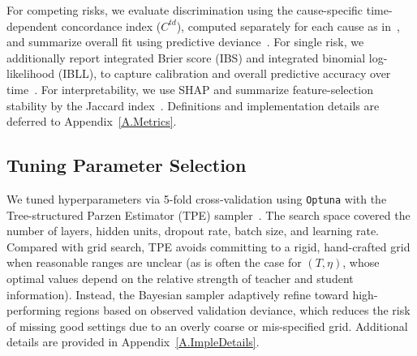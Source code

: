 \documentclass{article}
\theoremstyle{plain}
\theoremstyle{definition}
\theoremstyle{remark}
\begin{document}
For competing risks, we evaluate discrimination using the cause-specific time-dependent concordance index ($C^{td}$), computed separately for each cause as in~\citep{antolini2005time, lee2018deephit}, and summarize overall fit using predictive deviance~\citep{burnham1998practical, tutz2016modeling}.
For single risk, we additionally report integrated Brier score (IBS) and integrated binomial log-likelihood (IBLL), to capture calibration and overall predictive accuracy over time~\citep{gerds2006consistent, graf1999assessment, kvamme2019time, graf1999assessment, kvamme2019time}.
For interpretability, we use SHAP and summarize feature-selection stability by the Jaccard index~\citep{lundberg2017unified, vo2024explainability}.
Definitions and implementation details are deferred to Appendix~\ref{A.Metrics}.




\subsection{Tuning Parameter Selection}
\label{Tuning}
We tuned hyperparameters via 5-fold cross-validation using \texttt{Optuna} with the Tree-structured Parzen Estimator (TPE) sampler~\citep{optuna_2019}.
The search space covered the number of layers, hidden units, dropout rate, batch size, and learning rate. 
Compared with grid search, TPE avoids committing to a rigid, hand-crafted grid when reasonable ranges are unclear (as is often the case for $(T,\eta)$, whose optimal values depend on the relative strength of teacher and student information).
Instead, the Bayesian sampler adaptively refine toward high-performing regions based on observed validation deviance, which reduces the risk of missing good settings due to an overly coarse or mis-specified grid.
Additional details are provided in Appendix~\ref{A.ImpleDetails}.
\end{document}
